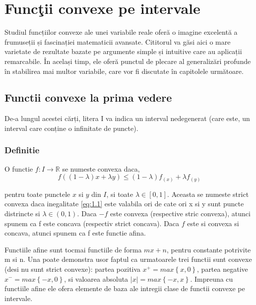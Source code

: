 \documentclass[a4paper,12pt,oneside]{report}
\begin{document}
\maketitle

\tableofcontents

%
%
%
%
\chapter{Func\c tii convexe pe intervale}

Studiul funcțiilor convexe ale unei variabile reale oferă o imagine excelentă a frumuseții și fascinației matematicii avansate. Cititorul va găsi aici o mare varietate de rezultate bazate pe argumente simple și intuitive care au aplicații remarcabile. În același timp, ele oferă punctul de plecare al generalizări profunde în stabilirea mai multor variabile, care vor fi discutate în capitolele următoare.

\section{Functii convexe la prima vedere}

De-a lungul acestei cărți, litera I va indica un interval nedegenerat (care este, un interval care conține o infinitate de puncte).

\subsection{Definitie}

O functie \(f: I \rightarrow \mathbb{R}\) se numeste convexa daca,
\begin{displaymath}
f \left ( \left ( 1 - \lambda  \right )x + \lambda y \right )\leq \left ( 1 - \lambda  \right ) f_{\left ( x \right )} + \lambda f_{\left ( y \right )} 	\label{eq:1.1} \tag{1.1}
\end{displaymath}

pentru toate punctele \(x\) si \(y\) din \(I\), si toate \(\lambda \in \left [ 0,1 \right ]\). Aceasta se numeste strict convexa daca inegalitate \ref{eq:1.1} este valabila ori de cate ori x si y sunt puncte distrincte si \(\lambda \in \left ( 0,1 \right )\). Daca \(-f\)  este convexa (respective stric convexa), atunci spunem ca f  este concava (respectiv strict concava). Daca \(f\) este si convexa si concava, atunci spunem ca f este functie afina. 


Functiile afine sunt tocmai functiile de forma \(mx + n\), pentru constante potrivite m si n. Una poate demonstra usor faptul ca urmatoarele trei functii sunt convexe (desi nu sunt strict convexe): partea pozitiva \(x^{+} = max \left \{ x,0 \right \}\), partea negative \(x^{-} = max \left \{ -x,0 \right \}\), si valoarea absoluta \(\left | x \right | = max \left \{ -x,x \right \}\). Impreuna cu functiile afine ele ofera elemente de baza ale intregii clase de functii convexe pe intervale. 
\end{document}

